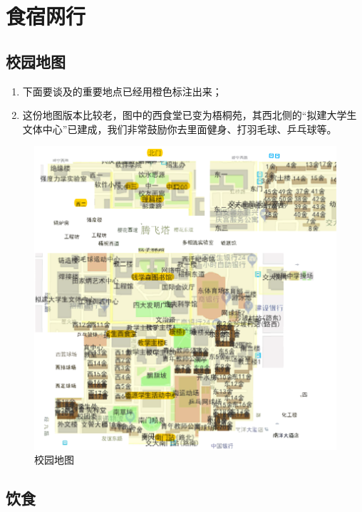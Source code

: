 \section{食宿网行}
    \subsection{校园地图}
    \begin{enumerate}
        \item 下面要谈及的重要地点已经用橙色标注出来；
        \item 这份地图版本比较老，图中的西食堂已变为梧桐苑，其西北侧的“拟建大学生文体中心”已建成，我们非常鼓励你去里面健身、打羽毛球、乒乓球等。
    \end{enumerate}
   
   \begin{figure}       
        \includegraphics[scale=0.7]{./picture/map.png}     
        \caption{校园地图}
        \label{map}  
    \end{figure}    



    \subsection{饮食}

